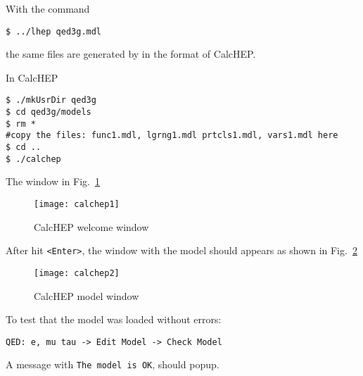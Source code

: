 \begin{frame}{}
With the command
\begin{lstlisting}
$ ../lhep qed3g.mdl
\end{lstlisting}
the same files are generated by in the format of CalcHEP.

In CalcHEP
\begin{lstlisting}
$ ./mkUsrDir qed3g
$ cd qed3g/models
$ rm *
#copy the files: func1.mdl, lgrng1.mdl prtcls1.mdl, vars1.mdl here
$ cd ..
$ ./calchep
\end{lstlisting}
The window in Fig.~\ref{fig:calchep1}
\begin{figure}
  \centering
  \texttt{[image: calchep1]}
  \caption{CalcHEP welcome window}
  \label{fig:calchep1}
\end{figure}
After hit \lstinline{<Enter>}, the window with the model should appears as shown in Fig.~\ref{fig:calchep2}
\begin{figure}
  \centering
  \texttt{[image: calchep2]}
  \caption{CalcHEP model window}
  \label{fig:calchep2}
\end{figure}
To test that the model was loaded without errors:
\begin{lstlisting}
QED: e, mu tau -> Edit Model -> Check Model
\end{lstlisting}
A message with \lstinline{The model is OK}, should popup.


\end{frame}
